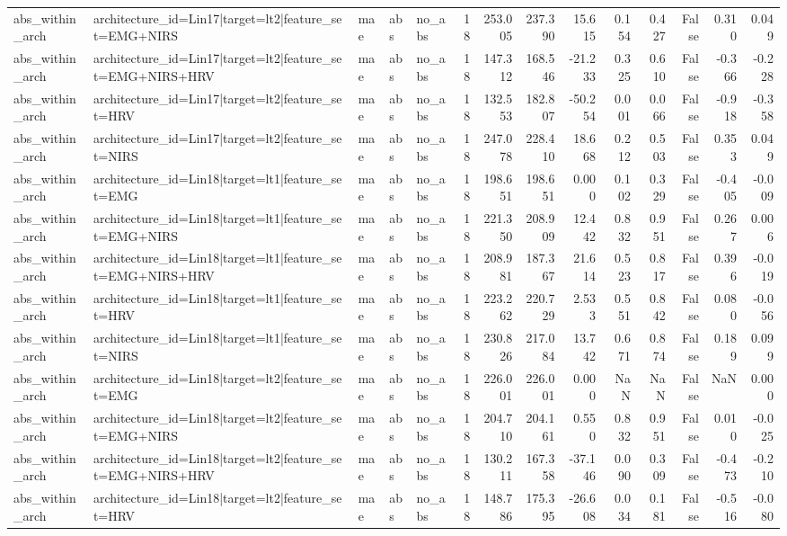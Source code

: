 \begin{table}
\begin{tabular}{lllllrrrrrrrrr}
abs_within_arch & architecture_id=Lin17|target=lt2|feature_set=EMG+NIRS & mae & abs & no_abs & 18 & 253.005 & 237.390 & 15.615 & 0.154 & 0.427 & False & 0.310 & 0.049 \\
abs_within_arch & architecture_id=Lin17|target=lt2|feature_set=EMG+NIRS+HRV & mae & abs & no_abs & 18 & 147.312 & 168.546 & -21.233 & 0.325 & 0.610 & False & -0.366 & -0.228 \\
abs_within_arch & architecture_id=Lin17|target=lt2|feature_set=HRV & mae & abs & no_abs & 18 & 132.553 & 182.807 & -50.254 & 0.001 & 0.066 & False & -0.918 & -0.358 \\
abs_within_arch & architecture_id=Lin17|target=lt2|feature_set=NIRS & mae & abs & no_abs & 18 & 247.078 & 228.410 & 18.668 & 0.212 & 0.503 & False & 0.353 & 0.049 \\
abs_within_arch & architecture_id=Lin18|target=lt1|feature_set=EMG & mae & abs & no_abs & 18 & 198.651 & 198.651 & 0.000 & 0.102 & 0.329 & False & -0.405 & -0.009 \\
abs_within_arch & architecture_id=Lin18|target=lt1|feature_set=EMG+NIRS & mae & abs & no_abs & 18 & 221.350 & 208.909 & 12.442 & 0.832 & 0.951 & False & 0.267 & 0.006 \\
abs_within_arch & architecture_id=Lin18|target=lt1|feature_set=EMG+NIRS+HRV & mae & abs & no_abs & 18 & 208.981 & 187.367 & 21.614 & 0.523 & 0.817 & False & 0.396 & -0.019 \\
abs_within_arch & architecture_id=Lin18|target=lt1|feature_set=HRV & mae & abs & no_abs & 18 & 223.262 & 220.729 & 2.533 & 0.551 & 0.842 & False & 0.080 & -0.056 \\
abs_within_arch & architecture_id=Lin18|target=lt1|feature_set=NIRS & mae & abs & no_abs & 18 & 230.826 & 217.084 & 13.742 & 0.671 & 0.874 & False & 0.189 & 0.099 \\
abs_within_arch & architecture_id=Lin18|target=lt2|feature_set=EMG & mae & abs & no_abs & 18 & 226.001 & 226.001 & 0.000 & NaN & NaN & False & NaN & 0.000 \\
abs_within_arch & architecture_id=Lin18|target=lt2|feature_set=EMG+NIRS & mae & abs & no_abs & 18 & 204.710 & 204.161 & 0.550 & 0.832 & 0.951 & False & 0.010 & -0.025 \\
abs_within_arch & architecture_id=Lin18|target=lt2|feature_set=EMG+NIRS+HRV & mae & abs & no_abs & 18 & 130.211 & 167.358 & -37.146 & 0.090 & 0.309 & False & -0.473 & -0.210 \\
abs_within_arch & architecture_id=Lin18|target=lt2|feature_set=HRV & mae & abs & no_abs & 18 & 148.786 & 175.395 & -26.608 & 0.034 & 0.181 & False & -0.516 & -0.080 \\

\end{tabular}
\end{table}
